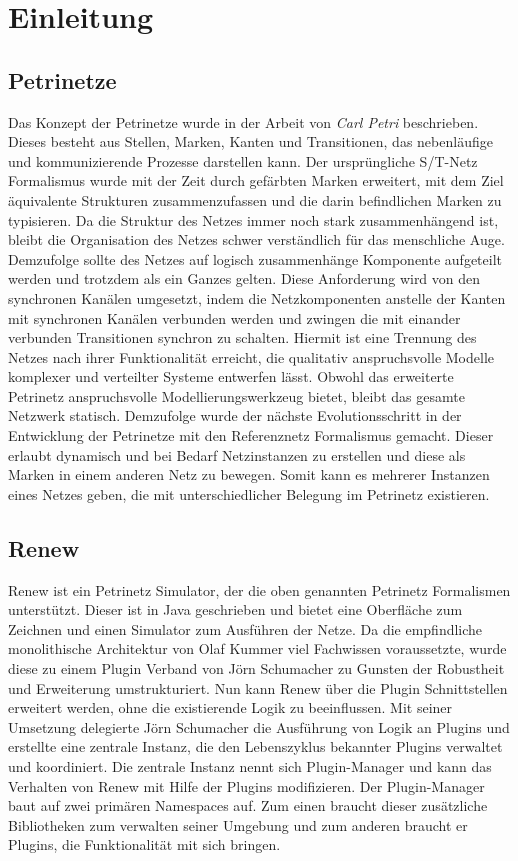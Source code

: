 \chapter{Einleitung}

\section{Petrinetze} 
Das Konzept der Petrinetze wurde in der Arbeit von \textit{Carl Petri} beschrieben. 
Dieses besteht aus Stellen, Marken, Kanten und Transitionen, das nebenläufige und kommunizierende Prozesse darstellen kann.
Der ursprüngliche S/T-Netz Formalismus wurde mit der Zeit durch gefärbten Marken erweitert, mit dem Ziel äquivalente Strukturen zusammenzufassen und die darin befindlichen Marken zu typisieren.
Da die Struktur des Netzes immer noch stark zusammenhängend ist, bleibt die Organisation des Netzes schwer verständlich für das menschliche Auge. \newline 
Demzufolge sollte des Netzes auf logisch zusammenhänge Komponente aufgeteilt werden und trotzdem als ein Ganzes gelten.
Diese Anforderung wird von den synchronen Kanälen umgesetzt, indem die Netzkomponenten anstelle der Kanten mit synchronen Kanälen verbunden werden und zwingen die mit einander verbunden Transitionen synchron zu schalten.
Hiermit ist eine Trennung des Netzes nach ihrer Funktionalität erreicht, die qualitativ anspruchsvolle Modelle komplexer und verteilter Systeme entwerfen lässt.\bigbreak
Obwohl das erweiterte Petrinetz anspruchsvolle Modellierungswerkzeug bietet, bleibt das gesamte Netzwerk statisch.
Demzufolge wurde der nächste Evolutionsschritt in der Entwicklung der Petrinetze mit den Referenznetz Formalismus gemacht. 
Dieser erlaubt dynamisch und bei Bedarf Netzinstanzen zu erstellen und diese als Marken in einem anderen Netz zu bewegen. 
Somit kann es mehrerer Instanzen eines Netzes geben, die mit unterschiedlicher Belegung im Petrinetz existieren. 

\section{Renew} 
Renew ist ein Petrinetz Simulator, der die oben genannten Petrinetz Formalismen unterstützt. Dieser ist in Java geschrieben und bietet eine Oberfläche zum Zeichnen und einen Simulator zum Ausführen der Netze. \newline 
Da die empfindliche monolithische Architektur von Olaf Kummer viel Fachwissen voraussetzte, wurde diese zu einem Plugin Verband von Jörn Schumacher zu Gunsten der Robustheit und Erweiterung umstrukturiert. Nun kann Renew über die Plugin Schnittstellen erweitert werden, ohne die existierende Logik zu beeinflussen. \bigbreak
Mit seiner Umsetzung delegierte Jörn Schumacher die Ausführung von Logik an Plugins und erstellte eine zentrale Instanz, die den Lebenszyklus bekannter Plugins verwaltet und koordiniert. Die zentrale Instanz nennt sich Plugin-Manager und kann das Verhalten von Renew mit Hilfe der Plugins modifizieren.
Der Plugin-Manager baut auf zwei primären Namespaces auf. Zum einen braucht dieser zusätzliche Bibliotheken zum verwalten seiner Umgebung und zum anderen braucht er Plugins, die Funktionalität mit sich bringen. 
\bigbreak 

